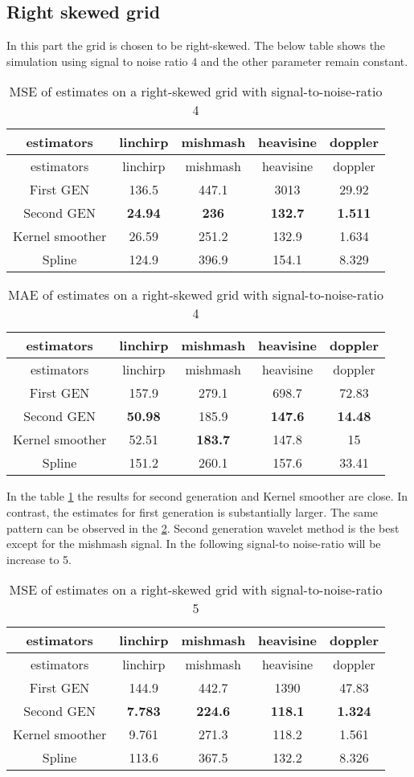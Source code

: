 \documentclass[12pt,twoside, a4paper]{reedthesis}
\begin{document}
\hypertarget{right-skewed-grid}{%
\subsection{Right skewed grid}\label{right-skewed-grid}}

In this part the grid is chosen to be right-skewed. The below table shows the simulation using signal to noise ratio 4 and the other parameter remain constant.
\begin{longtable}[]{@{}ccccc@{}}
\caption{\label{tbl:msebetaright4}MSE of estimates on a right-skewed grid with signal-to-noise-ratio 4}\tabularnewline
\toprule
estimators & linchirp & mishmash & heavisine & doppler\tabularnewline
\midrule
\endfirsthead
\toprule
estimators & linchirp & mishmash & heavisine & doppler\tabularnewline
\midrule
\endhead
First GEN & 136.5 & 447.1 & 3013 & 29.92\tabularnewline
Second GEN & \textbf{24.94} & \textbf{236} & \textbf{132.7} & \textbf{1.511}\tabularnewline
Kernel smoother & 26.59 & 251.2 & 132.9 & 1.634\tabularnewline
Spline & 124.9 & 396.9 & 154.1 & 8.329\tabularnewline
\bottomrule
\end{longtable}
\begin{longtable}[]{@{}ccccc@{}}
\caption{\label{tbl:maebetaright4}MAE of estimates on a right-skewed grid with signal-to-noise-ratio 4}\tabularnewline
\toprule
estimators & linchirp & mishmash & heavisine & doppler\tabularnewline
\midrule
\endfirsthead
\toprule
estimators & linchirp & mishmash & heavisine & doppler\tabularnewline
\midrule
\endhead
First GEN & 157.9 & 279.1 & 698.7 & 72.83\tabularnewline
Second GEN & \textbf{50.98} & 185.9 & \textbf{147.6} & \textbf{14.48}\tabularnewline
Kernel smoother & 52.51 & \textbf{183.7} & 147.8 & 15\tabularnewline
Spline & 151.2 & 260.1 & 157.6 & 33.41\tabularnewline
\bottomrule
\end{longtable}
In the table \ref{tbl:msebetaright4} the results for second generation and Kernel smoother are close. In contrast, the estimates for first generation is substantially larger. The same pattern can be observed in the \ref{tbl:maebetaright4}. Second generation wavelet method is the best except for the mishmash signal. In the following signal-to noise-ratio will be increase to 5.
\begin{longtable}[]{@{}ccccc@{}}
\caption{\label{tbl:msebetaright5}MSE of estimates on a right-skewed grid with signal-to-noise-ratio 5}\tabularnewline
\toprule
estimators & linchirp & mishmash & heavisine & doppler\tabularnewline
\midrule
\endfirsthead
\toprule
estimators & linchirp & mishmash & heavisine & doppler\tabularnewline
\midrule
\endhead
First GEN & 144.9 & 442.7 & 1390 & 47.83\tabularnewline
Second GEN & \textbf{7.783} & \textbf{224.6} & \textbf{118.1} & \textbf{1.324}\tabularnewline
Kernel smoother & 9.761 & 271.3 & 118.2 & 1.561\tabularnewline
Spline & 113.6 & 367.5 & 132.2 & 8.326\tabularnewline
\bottomrule
\end{longtable}
\end{document}
